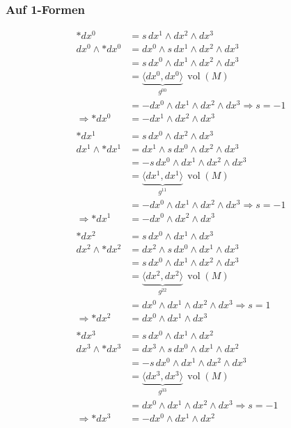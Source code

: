 \subsubsection{Auf 1-Formen}
\begin{align*}
	\ast dx^0 
	&=
	s \, dx^1 \wedge dx^2 \wedge dx^3
	\\
	dx^0 \wedge \ast dx^0 
	&=
	dx^0 \wedge s \, dx^1 \wedge dx^2 \wedge dx^3 
	\\
	&=
	s \, dx^0 \wedge dx^1 \wedge dx^2 \wedge dx^3
	\\
	&=
	\underbrace{\langle dx^0, dx^0 \rangle}_{g^{00}} \, \operatorname{vol}(M) 
	\\
	&= - dx^0 \wedge dx^1 \wedge dx^2 \wedge dx^3 \Rightarrow s = -1
	\\
	\Rightarrow \ast dx^0 
	&=
	- dx^1 \wedge dx^2 \wedge dx^3
\\
\\
	\ast dx^1 
	&=
	s \, dx^0 \wedge dx^2 \wedge dx^3
	\\
	dx^1 \wedge \ast dx^1 
	&=
	dx^1 \wedge s \, dx^0 \wedge dx^2 \wedge dx^3 
	\\
	&=
	-s \, dx^0 \wedge dx^1 \wedge dx^2 \wedge dx^3
	\\
	&=
	\underbrace{\langle dx^1, dx^1 \rangle}_{g^{11}} \, \operatorname{vol}(M) 
	\\
	&=
	- dx^0 \wedge dx^1 \wedge dx^2 \wedge dx^3 \Rightarrow s = -1
	\\
	\Rightarrow \ast dx^1 
	&=
	- dx^0 \wedge dx^2 \wedge dx^3
\\
\\
	\ast dx^2 
	&=
	s \, dx^0 \wedge dx^1 \wedge dx^3
	\\
	dx^2 \wedge \ast dx^2 
	&=
	dx^2 \wedge s \, dx^0 \wedge dx^1 \wedge dx^3 
	\\
	&=
	s \, dx^0 \wedge dx^1 \wedge dx^2 \wedge dx^3
	\\
	&=
	\underbrace{\langle dx^2, dx^2 \rangle}_{g^{22}} \, \operatorname{vol}(M) 
	\\
	&=
	dx^0 \wedge dx^1 \wedge dx^2 \wedge dx^3 \Rightarrow s = 1
	\\
	\Rightarrow \ast dx^2 
	&=
	dx^0 \wedge dx^1 \wedge dx^3
\\
\\
	\ast dx^3 
	&=
	s \, dx^0 \wedge dx^1 \wedge dx^2
	\\
	dx^3 \wedge \ast dx^3 
	&=
	dx^3 \wedge s \, dx^0 \wedge dx^1 \wedge dx^2 
	\\
	&= -s \, dx^0 \wedge dx^1 \wedge dx^2 \wedge dx^3
	\\
	&=
	\underbrace{\langle dx^3, dx^3 \rangle}_{g^{33}} \, \operatorname{vol}(M) 
	\\
	&=
	dx^0 \wedge dx^1 \wedge dx^2 \wedge dx^3 \Rightarrow s = -1
	\\
	\Rightarrow \ast dx^3 
	&=
	-dx^0 \wedge dx^1 \wedge dx^2
\end{align*}

